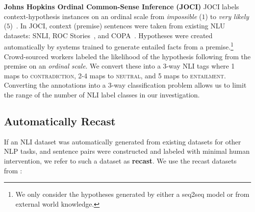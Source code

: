 \begin{datalist}
\item[] \textbf{Johns Hopkins Ordinal Common-Sense Inference (JOCI)} JOCI labels context-hypothesis instances on an ordinal scale from \textit{impossible} ($1$) to \textit{very likely} ($5$)~\cite{TACL1082}. In JOCI, context (premise) sentences were taken from existing NLU datasets: SNLI, ROC Stories~\cite{mostafazadeh-EtAl:2016:N16-1}, and COPA~\cite{roemmele2011choice}. Hypotheses were created automatically by systems trained to generate entailed facts from a premise.\footnote{
We only consider the hypotheses generated by either a seq2seq model or from external world knowledge.} Crowd-sourced workers labeled the likelihood of the hypothesis following from the premise on an \emph{ordinal scale}.  We convert these into a $3$-way NLI tags where 1 maps to \textsc{contradiction}, 2-4 maps to \textsc{neutral}, and 5 maps to \textsc{entailment}.
Converting the annotations into a $3$-way classification problem allows us to limit the range of the number of NLI label classes in our investigation.

\end{datalist}

\subsection{Automatically Recast} If an NLI dataset was automatically generated from existing datasets for other NLP tasks, and sentence pairs were constructed and labeled with minimal human intervention, we refer to such a dataset as \textbf{recast}. We use the  recast datasets from :

